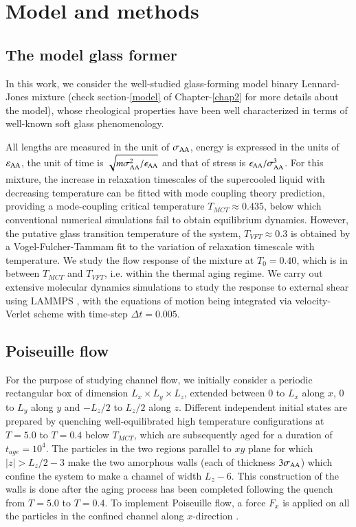                                                         
\section{Model and methods}

\subsection{The model glass former}

In this work, we consider the well-studied glass-forming model binary Lennard-Jones mixture \cite{Kob94} (check section-\ref{model} of Chapter-\ref{chap2} for more details about the model), whose rheological properties have been well characterized in terms of well-known soft glass phenomenology. 

All lengths are measured in the unit of $\sigma_{\rm AA}$, energy is expressed in the units of $\varepsilon_{\rm AA}$, the unit of time is $\sqrt{{m\sigma_{\rm AA}^{2}}/\epsilon_{\rm AA}}$ and that of stress is $\epsilon_{\rm AA}/ \sigma_{\rm AA}^{3}$. For this mixture,  the increase in relaxation timescales of the supercooled liquid with decreasing temperature can be fitted with mode coupling theory prediction, providing a mode-coupling critical temperature $T_{MCT} \approx 0.435$, below which conventional numerical simulations fail to obtain equilibrium dynamics. However, the putative glass transition temperature of the system, $T_{VFT} \approx 0.3$ is obtained by a Vogel-Fulcher-Tammam fit to the variation of relaxation timescale with temperature. We study the flow response of the mixture at $T_0=0.40$, which is in between  $T_{MCT}$ and $T_{VFT}$, i.e. within the thermal aging regime. We carry out extensive molecular dynamics simulations to study the response to external shear using  LAMMPS \cite{lammps}, with the equations of motion being integrated via velocity-Verlet scheme with time-step $\Delta t = 0.005$.

\subsection{Poiseuille flow}

For the purpose of studying channel flow, we initially consider a periodic rectangular box of dimension $L_x \times L_y \times L_z$, extended between $0$ to $L_x$ along $x$, $0$ to $L_y$ along $y$ and  $-L_z/2$ to $L_z/2$  along $z$. Different independent initial states are prepared by quenching well-equilibrated high temperature configurations at $T=5.0$  to $T=0.4$ below $T_{MCT}$, which are subsequently aged for a duration of $t_{age} = 10^4$. The particles in the two regions parallel to $xy$ plane for which $|z| > L_z/2 -3$ make the two amorphous walls (each of thickness $3 \sigma_{\rm AA}$) which confine the system to make a channel of width $L_z-6$. This construction of the walls is done after the aging process has been completed following the quench from $T=5.0$  to $T=0.4$. To implement Poiseuille flow, a force $F_x$ is applied on all the particles in the confined channel along $x$-direction \cite{todd1995pressure}. 


